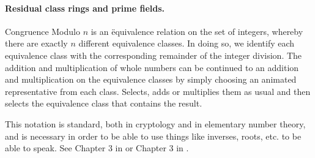 \paragraph{Residual class rings and prime fields.}
Congruence Modulo $ n $ is an \"equivalence relation on the set of integers, whereby there are exactly $ n $ different equivalence classes. In doing so, we identify each equivalence class with the corresponding remainder of the integer division. The addition and multiplication of whole numbers can be continued to an addition and multiplication on the equivalence classes by simply choosing an animated representative from each class. Selects, adds or multiplies them as usual and then selects the equivalence class that contains the result.

This notation is standard, both in cryptology and in elementary number theory, and is necessary in order to be able to use things like inverses, roots, etc. to be able to speak. See Chapter 3 in \cite{JB} or Chapter 3 in \cite{AL}.

